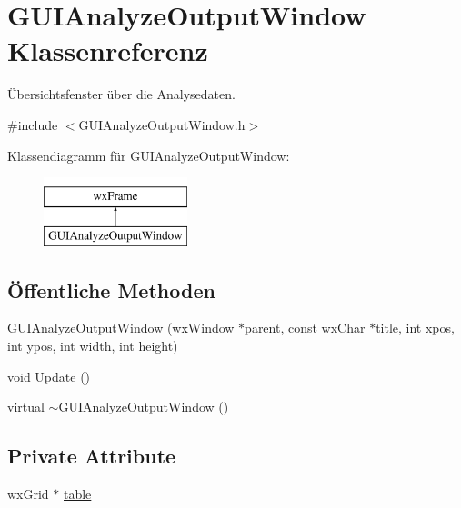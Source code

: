 \hypertarget{classGUIAnalyzeOutputWindow}{\section{G\-U\-I\-Analyze\-Output\-Window Klassenreferenz}
\label{classGUIAnalyzeOutputWindow}
}


Übersichtsfenster über die Analysedaten.  




{\ttfamily \#include $<$G\-U\-I\-Analyze\-Output\-Window.\-h$>$}

Klassendiagramm für G\-U\-I\-Analyze\-Output\-Window\-:\begin{figure}[H]
\begin{center}
\leavevmode
\includegraphics[height=2.000000cm]{classGUIAnalyzeOutputWindow}
\end{center}
\end{figure}
\subsection*{Öffentliche Methoden}
\begin{DoxyCompactItemize}
\item 
\hyperlink{classGUIAnalyzeOutputWindow_af9407245a6b2a0478579c4d592a31e63}{G\-U\-I\-Analyze\-Output\-Window} (wx\-Window $\ast$parent, const wx\-Char $\ast$title, int xpos, int ypos, int width, int height)
\item 
void \hyperlink{classGUIAnalyzeOutputWindow_a9ea5a7cf46d6189f368315903508cecc}{Update} ()
\item 
virtual \hyperlink{classGUIAnalyzeOutputWindow_a8c5f2447557358ea724b68a89f363e37}{$\sim$\-G\-U\-I\-Analyze\-Output\-Window} ()
\end{DoxyCompactItemize}
\subsection*{Private Attribute}
\begin{DoxyCompactItemize}
\item 
wx\-Grid $\ast$ \hyperlink{classGUIAnalyzeOutputWindow_afa1bc15fd767bfb9922e880403fb4305}{table}
\end{DoxyCompactItemize}


